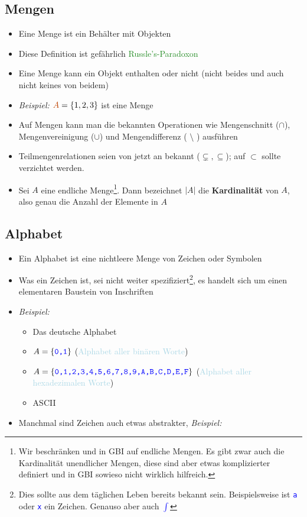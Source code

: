 \documentclass{article}
\newcommand{\blue}[1]{\textcolor{blue}{#1}}
\newcommand{\babyblue}[1]{\textcolor{lightblue}{#1}}
\newcommand{\strongColor}[1]{\textcolor{strongColor}{#1}}
\newcommand{\strong}[1]{\textbf{\strongColor{#1}}}
\newcommand{\verweis}[1]{\textcolor{ForestGreen}{#1}}
\newcommand{\example}[1]{\textit{Beispiel: }#1}
\newcommand{\word}[1]{\blue{\texttt{#1}}}
\newcommand{\interpretation}[1]{\babyblue{#1}}
\newcommand{\Fbox}[1]{\fbox{\strut#1}}
\newcommand*{\wordbox}[1]{\Fbox{#1}}
\begin{document}
\subsection{Mengen}
\begin{itemize}
    \item Eine Menge ist ein \dq Behälter\dq{} mit \dq Objekten\dq{}
    \item Diese Definition ist gefährlich \verweis{Russle's-Paradoxon}
    \item Eine Menge kann ein Objekt enthalten oder nicht (nicht beides und auch nicht keines von beidem)
    \item \example{$\strongColor{A} = \{1,2,3\}$} ist eine Menge
    \item Auf Mengen kann man die bekannten Operationen wie Mengenschnitt ($\cap$), Mengenvereinigung ($\cup$) und Mengendifferenz ( $\setminus$ ) ausführen
    \item Teilmengenrelationen seien von jetzt an bekannt ($\subsetneq, \subseteq$); auf $\subset$ sollte verzichtet werden.
    \item Sei $A$ eine endliche Menge\footnote{Wir beschränken und in GBI auf endliche Mengen. Es gibt zwar auch die Kardinalität unendlicher Mengen, diese sind aber etwas komplizierter definiert und in GBI sowieso nicht wirklich hilfreich.}. Dann bezeichnet $|A|$ die \strong{Kardinalität} von $A$, also genau die Anzahl der Elemente in $A$
\end{itemize}

\subsection{Alphabet}
\begin{itemize}
    \item Ein Alphabet ist eine nichtleere Menge von Zeichen oder Symbolen
    \item Was ein Zeichen ist, sei nicht weiter spezifiziert\footnote{Dies sollte aus dem täglichen Leben bereits bekannt sein. Beispielsweise ist \word{a} oder \word{x} ein Zeichen. Genauso aber auch \word{$\int$}}, es handelt sich um einen elementaren Baustein von Inschriften
    \item \example{}
    \begin{itemize}
        \item Das deutsche Alphabet
        \item $A=\{\word{0,1}\}$ (\interpretation{Alphabet aller binären Worte})
        \item $A=\{\word{0,1,2,3,4,5,6,7,8,9,A,B,C,D,E,F}\}$ (\interpretation{Alphabet aller hexadezimalen Worte})
        \item ASCII
    \end{itemize}
    \item Manchmal sind Zeichen auch etwas abstrakter, \example{\word{\wordbox{int} \wordbox{counter} \wordbox{=} \wordbox{42} \wordbox{;}}}
\end{itemize}
\end{document}
